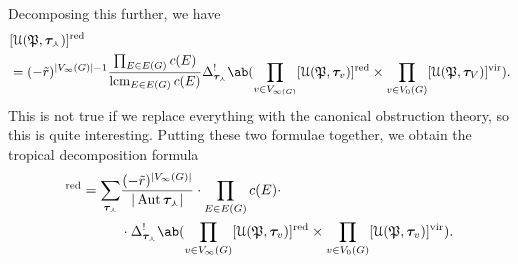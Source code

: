 \documentclass[10pt]{amsart}
\theoremstyle{definition}
\theoremstyle{remark}
\theoremstyle{plain}
\theoremstyle{definition}
\theoremstyle{remark}
\newcommand{\mc}[1]{\mathcal{#1}}
\newcommand{\mf}[1]{\mathfrak{#1}}
\newcommand{\btau}{\bm{\tau}}
\newcommand{\mr}[1]{\mathrm{#1}}
\newcommand{\on}[1]{\operatorname{#1}}
\newcommand{\1}{\mathbf{1}}
\newcommand{\2}{\mathbf{2}}
\newcommand{\3}{\mathbf{3}}
\newcommand{\vir}{\mr{vir}}
\newcommand{\red}{\mr{red}}
\DeclareMathOperator{\Aut}{Aut}
\begin{document}
Decomposing this further, we have
\begin{align*}
    &[\mc{U}(\mf{P}, \btau_{\curlywedge})]^{\on{red}} \\ 
    &= (-\tilde{r})^{|V_{\infty}(G)|-1} \frac{\prod_{E \in E(G)} c(E)}{\on{lcm}_{E \in E(G)} c(E)} \Delta^!_{\btau_{\curlywedge}} \ab(\prod_{v \in V_{\infty(G)}} [\mc{U}(\mf{P}, \btau_v)]^{\on{red}} \times \prod_{v \in V_0(G)} [\mc{U}(\mf{P}, \btau_V)]^{\vir}). 
\end{align*}
This is not true if we replace everything with the canonical obstruction theory, so this is quite interesting. Putting these two formulae together, we obtain the tropical decomposition formula
\begin{align*}
    [\mc{U}_{g, \mc{C}}(\mf{P}, \beta)]^{\on{red}} = \sum_{\btau_{\curlywedge}} & \frac{(-\tilde{r})^{|V_{\infty}(G)|}}{|\Aut \btau_{\curlywedge}|} \cdot \prod_{E \in E(G)} c(E) \cdot \\
    & \cdot \Delta_{\btau_{\curlywedge}}^! \ab( \prod_{v \in V_{\infty}(G)}[\mc{U}(\mf{P},\btau_{v})]^{\red} \times \prod_{v \in V_0(G)} [\mc{U}(\mf{P},\btau_v)]^{\vir}).
\end{align*}
\end{document}

